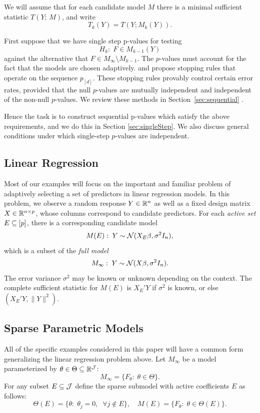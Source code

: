 \documentclass{article}
\begin{document}
We will assume that for each candidate model $M$ there is a minimal sufficient statistic $T(Y; \,M)$, and write
\[
T_k(Y) = T(Y; M_k(Y)).
\]

First suppose that we have single step p-values for testing
\[
H_{k}:\; F\in M_{k-1}(Y)
\]
against the alternative that $F\in M_\infty\setminus M_{k-1}$. The $p$-values must account for the fact that the models are chosen adaptively. 
\citet{gsell2013sequential} and \citet{li2015accumulation} propose stopping rules that operate on the sequence $p_{[d]}$. These stopping rules provably control certain error rates, provided that the null $p$-values are mutually independent and independent of the non-null $p$-values. 
We review these methods in Section~\ref{sec:sequential} .

Hence the task is to  construct sequential p-values which satisfy the above requirements, and we do this in Section \ref{sec:singleStep}.
We also discuss general conditions under which single-step $p$-values are independent.


\subsection{Linear Regression}

Most of our examples will focus on the important and familiar problem of adaptively selecting a set of predictors in linear regression models. In this problem, we observe a random response $Y\in \mathbb{R}^n$ as well as a fixed design matrix $X\in \mathbb{R}^{n \times p}$, whose columns correspond to candidate predictors. For each {\em active set} $E \subseteq [p]$, there is a corresponding candidate model
\[
M(E):\; Y \sim \mathcal{N}( X_E\beta, \sigma^2 I_n),
\]
which is a subset of the {\em full model}
\[
M_\infty:\; Y \sim \mathcal{N}(X\beta, \sigma^2I_n).
\]
The error variance $\sigma^2$ may be known or unknown depending on the context. The complete sufficient statistic for $M(E)$ is $X_E'Y$ if $\sigma^2$ is known, or else $\left(X_E'Y, \|Y\|^2\right)$.

\subsection{Sparse Parametric Models}\label{sec:genSparse}

All of the specific examples considered in this paper will have a common form generalizing the linear regression problem above. Let $M_\infty$ be a model parameterized by $\theta\in \Theta \subseteq \mathbb{R}^{\mathcal{J}}$:
\[
M_\infty = \{F_\theta:\; \theta \in \Theta\}.
\]
For any subset $E\subseteq \mathcal{J}$ define the sparse submodel with active coefficients $E$ as follows:
\[
\Theta(E) = \{\theta:\; \theta_j = 0, \;\;\forall j \notin E\}, 
\quad M(E) = \{F_\theta:\; \theta\in \Theta(E)\}.
\]
\end{document}
